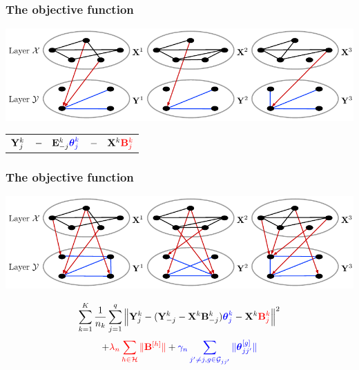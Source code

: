 \documentclass[10pt]{beamer}
\theoremstyle{definition}
\begin{document}
\begin{frame}
\frametitle{The objective function}

\begin{center}
\includegraphics[width=.9\textwidth]{multitwolayer_j}
\end{center}

\begin{center}
\begin{tabular}{ccc}%
$ {\mathbf{Y}}_j^k$ & $- \quad {\mathbf{E}}_{-j}^k {\color{blue}  {\boldsymbol{\theta}}_j^k}$ & $- \quad {\mathbf{X}}^k {\color{red} {\mathbf{B}}_j^k }$
\end{tabular}


\end{center}

\end{frame}

\begin{frame}
\frametitle{The objective function}

\begin{center}
\includegraphics[width=.9\textwidth]{multitwolayer}
\end{center}

$$
\sum_{k=1}^K \frac{1}{n_k} \sum_{j=1}^q
\left\| {\mathbf{Y}}_j^k - ({\mathbf{Y}}_{-j}^k - {\mathbf{X}}^k {\mathbf{B}}_{-j}^k) {\color{blue}  {\boldsymbol{\theta}}_j^k}
- {\mathbf{X}}^k {\color{red} {\mathbf{B}}_j^k } \right\|^2
$$
$$
+ {\color{red} \lambda_n \sum_{h \in {\cal{H}}} \| {\mathbf{B}}^{[h]} \|}
+ {\color{blue} \gamma_n \sum_{j' \neq j, g \in {\cal{G}}_{jj'}} \| {\boldsymbol{\theta}}_{jj'}^{[g]} \|}
$$
\end{frame}
\end{document}
